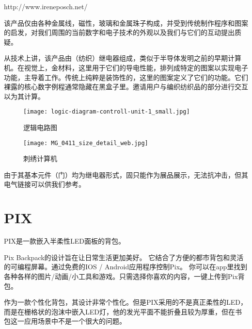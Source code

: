 http://www.ireneposch.net/

该产品仅由各种金属线，磁性，玻璃和金属珠子构成，并受到传统制作程序和图案的启发，对我们周围的当前数字和电子技术的外观以及我们与它们的互动提出质疑。

从技术上讲，该产品由（纺织）继电器组成，类似于半导体发明之前的早期计算机。在视觉上，金材料，这里用于它们的导电性能，排列成特定的图案以实现电子功能，主导着工作。传统上纯粹是装饰性的，这里的图案定义了它们的功能。它们裸露的核心数字例程通常隐藏在黑盒子里。邀请用户与编织纺织品的部分进行交互以为其计算。


\begin{figure}[htbp]
\centering
\texttt{[image: logic-diagram-controll-unit-1\_small.jpg]}
\caption{逻辑电路图} 
\label{1}
\end{figure}

\begin{figure}[htbp]
\centering
\texttt{[image: MG\_0411\_size\_detail\_web.jpg]}
\caption{刺绣计算机} 
\label{2}
\end{figure}


由于其基本元件（门）均为继电器形式，固只能作为展品展示，无法抗冲击，但其电气链接可以供我们参考。

\newpage

\section{PIX}
PIX是一款嵌入半柔性LED面板的背包。

Pix Backpack的设计旨在让日常生活更加美好。 它结合了方便的都市背包和灵活的可编程屏幕。通过免费的IOS / Android应用程序控制Pix。 你可以在app里找到各种各样的图片/动画/小工具和游戏。只需选择你喜欢的内容，一键上传到Pix背包。

作为一款个性化背包，其设计非常个性化。但是PIX采用的不是真正柔性的LED，而是在栅格状的泡沫中嵌入LED灯，他的发光平面不能折叠且较为厚重，但在书包这一应用场景中不是一个很大的问题。

